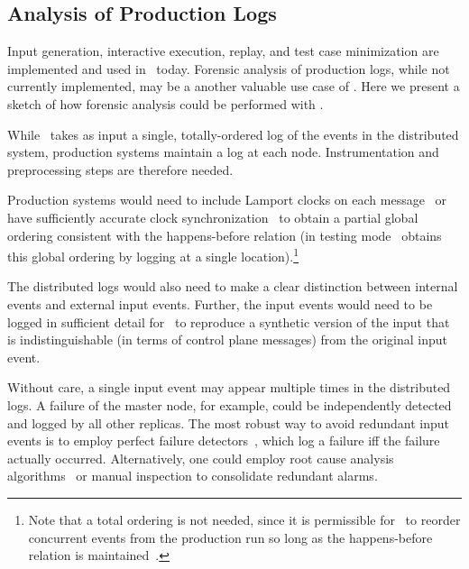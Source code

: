 \subsection{Analysis of Production Logs}

Input generation, interactive execution, replay, and test case
minimization are implemented and used in \projectname~today.
Forensic analysis of production logs, while not currently implemented,
may be a another valuable use case of \projectname. Here we present a sketch of
how forensic analysis could be performed with \simulator.

While \simulator~takes as input a single, totally-ordered log of the events in the
distributed system, production systems maintain a log at each node.
Instrumentation and preprocessing steps are therefore needed.

Production systems would need to include Lamport
clocks on each message~\cite{Lamport:1978:TCO:359545.359563} or have
sufficiently accurate clock
synchronization~\cite{corbett2012spanner} to obtain a partial global ordering
consistent with the happens-before relation (in testing mode
\projectname~obtains this global ordering by logging at a single location).\footnote{
Note that a total ordering is not needed, since it is permissible
for \simulator~to reorder concurrent events from
the production run so long as the happens-before relation is
maintained~\cite{Fischer:1985:IDC:3149.214121}.}

The distributed logs would also need to make a clear distinction between
internal events and external input events. Further,
the input events would need to be logged in sufficient detail for \projectname~to
reproduce a synthetic version of the input that is indistinguishable (in terms
of control plane messages) from the original input event.

Without care, a single input event may appear multiple times in the
distributed logs. A failure of the master node, for example, could be independently
detected and logged by all other replicas. The most robust way to
avoid redundant input events is to employ perfect failure
detectors~\cite{chandra1996unreliable}, which log a failure iff
the failure actually occurred. %
Alternatively, one
could employ root cause analysis
algorithms~\cite{yemini1996} or manual inspection to consolidate redundant
alarms.

